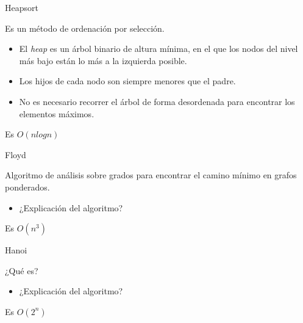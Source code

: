 \documentclass[spanish]{beamer}
\begin{document}
\begin{frame}{Heapsort}

	Es un método de ordenación por selección.

	\vskip 0.5cm
	
	\begin{itemize}
		\item El \textit{heap} es un árbol binario de altura mínima, en el que los nodos del nivel más bajo están lo más a la izquierda posible.
		\item Los hijos de cada nodo son siempre menores que el padre.
		\item No es necesario recorrer el árbol de forma desordenada para encontrar los elementos máximos.
	\end{itemize}
	
	\vskip 0.5cm
	
	Es $O(nlogn)$
\end{frame}


\begin{frame}
	\begin{center}
		
	\end{center}
\end{frame}

\begin{frame}{Floyd}

	Algoritmo de análisis sobre grados para encontrar el camino mínimo en grafos ponderados.

	\vskip 0.5cm
	
	\begin{itemize}
		\item ¿Explicación del algoritmo?
	\end{itemize}
	
	\vskip 0.5cm
	
	Es $O(n^3)$
\end{frame}

\begin{frame}
	\begin{center}
		
	\end{center}
\end{frame}

\begin{frame}{Hanoi}

	¿Qué es?

	\vskip 0.5cm
	
	\begin{itemize}
		\item ¿Explicación del algoritmo?
	\end{itemize}
	
	\vskip 0.5cm
	
	Es $O(2^n)$
\end{frame}
\end{document}
